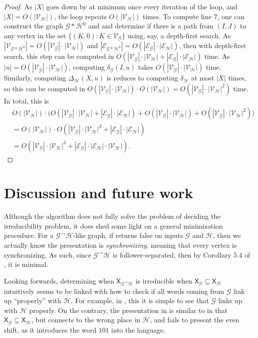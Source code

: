 \documentclass[hidelinks]{report}
\newcommand{\Gc}{\mathcal{G}}  %
\newcommand{\Hc}{\mathcal{H}}  %
\newcommand{\Vc}{\mathcal{V}}
\newcommand{\Ec}{\mathcal{E}}
\newcommand{\GtH}{{\Gc^\to\Hc}}
\newcommand{\shift}[1]{\mathsf{X}_{#1}}
\newcommand{\term}[1]{\textit{#1}}
\theoremstyle{definition}
\begin{document}
\begin{proof}
    As \(|X|\) goes down by at minimum once every iteration of the loop, 
    and \(|X| = O(|\Vc_\Hc|)\), the loop repeats \(O(|\Vc_\Hc|)\) times. To compute line 7, 
    one can construct the graph \(\Gc * \Hc^0\) and and determine 
    if there is a path from \((I, J)\) to any vertex in the set 
    \(\{(K, 0) : K \in \Vc_\Gc\}\) using, say, a depth-first search.
    As \(|\Vc_{\Gc * \Hc^0}| = O(|\Vc_\Gc|\cdot|\Vc_\Hc|)\) and 
    \(|\Ec_{\Gc * \Hc^0}| = O(|\Ec_\Gc|\cdot|\Ec_\Hc|)\), then with 
    depth-first search, this step can be computed in \(O(|\Vc_\Gc|\cdot|\Vc_\Hc| + |\Ec_\Gc|\cdot|\Ec_\Hc|)\)
    time. As \(|u| = O(|\Vc_\Gc|\cdot|\Vc_\Hc|)\), computing \(\delta_\Gc(I, u)\) 
    takes \(O(|\Vc_\Gc|\cdot|\Vc_\Hc|)\) time. Similarly, computing 
    \(\Delta_\Hc(X, u)\) is reduces to computing \(\delta_\Hc\) at most \(|X|\) times, so 
    this can be computed in \(O(|\Vc_\Gc|\cdot|\Vc_\Hc|)\cdot O(|\Vc_\Hc|) = O(|\Vc_\Gc| \cdot |\Vc_\Hc|^2)\) time.
    In total, this is 
    \begin{align*}
        & O(|\Vc_\Hc|)\cdot \big( O(|\Vc_\Gc|\cdot|\Vc_\Hc| + |\Ec_\Gc|\cdot|\Ec_\Hc|) + O(|\Vc_\Gc|\cdot|\Vc_\Hc|) + O(|\Vc_\Gc|\cdot|\Vc_\Hc|^2)\big)
        \\ &= O(|\Vc_\Hc|)\cdot O(|\Vc_\Gc|\cdot|\Vc_\Hc|^2 + |\Ec_\Gc|\cdot|\Ec_\Hc|) \\ 
        &= O(|\Vc_\Gc|\cdot|\Vc_\Hc|^3 + |\Ec_\Gc|\cdot|\Ec_\Hc|\cdot|\Vc_\Hc|).
    \end{align*}
\end{proof}

\chapter{Discussion and future work}

Although the algorithm does not fully solve the problem of deciding 
the irreducibility problem, it does shed some light on a general minimization 
procedure. For a \(\GtH\)-like graph, if  returns 
false on inputs \(\Gc\) and \(\Hc\), then we actually know the presentation 
is \term{synchronizing}, meaning that every vertex is synchronizing.
As such, since \(\GtH\) is follower-separated, then by Corollary 5.4 of
\cite{jonoska1996sofic}, it is minimal.

Looking forwards, determining when \(\shift{\GtH}\) is irreducible when 
\(\shift{\Gc} \subseteq \shift{\Hc}\) intuitively seems to be linked 
with how to check if all words coming from \(\Gc\) link up ``properly''
with \(\Hc\). For example, in , this it is 
simple to see that \(\Gc\) links up with \(\Hc\) properly.
On the contrary, the presentation in  is similar 
to  in that \(\shift{\Gc} \subseteq \shift{\Hc}\),
but connects to the wrong place in \(\Hc\), and fails to 
present the even shift, as it introduces the word 
\(101\) into the language.
\end{document}
